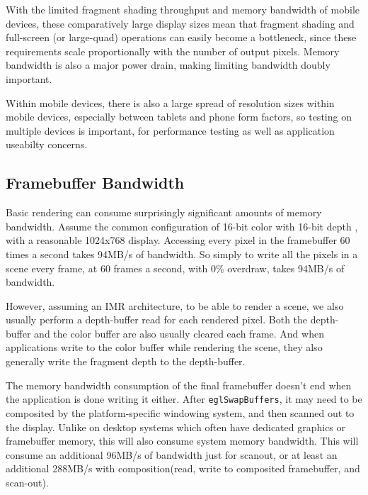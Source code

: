 
With the limited fragment shading throughput and memory bandwidth of mobile
devices, these comparatively large display sizes mean that fragment shading and
full-screen (or large-quad) operations can easily become a bottleneck, since these requirements scale proportionally with the number of output pixels.  Memory
bandwidth is also a major power drain, making limiting bandwidth doubly
important.

Within mobile devices, there is also a large spread of resolution sizes within
mobile devices, especially between tablets and phone form factors, so testing
on multiple devices is important, for performance testing as well as
application useabilty concerns.

\subsection{Framebuffer Bandwidth}\label{Jon-McCaffrey-Framebuffer-Bandwidth}

Basic rendering can consume surprisingly significant amounts of memory
bandwidth.  Assume the common configuration of 16-bit color with 16-bit depth
\cite{Google11}, with a reasonable 1024x768 display.  Accessing every pixel in
the framebuffer 60 times a second takes 94MB/s of bandwidth.  So simply to
write all the pixels in a scene every frame, at 60 frames a second, with 0\%
overdraw, takes 94MB/s of bandwidth.

 

However, assuming an IMR architecture, to be able to render a scene, we also
usually perform a depth-buffer read for each rendered pixel.  Both the
depth-buffer and the color buffer are also usually cleared each frame.  And
when applications write to the color buffer while rendering the scene, they
also generally write the fragment depth to the depth-buffer.

The memory bandwidth consumption of the final framebuffer doesn't end when the
application is done writing it either.  After \texttt{eglSwapBuffers}, it may
need to be composited by the platform-specific windowing system, and then
scanned out to the display.  Unlike on desktop systems which often have
dedicated graphics or framebuffer memory, this will also consume system memory
bandwidth.  This will consume an additional 96MB/s of bandwidth just for
scanout, or at least an additional 288MB/s with composition(read, write to
composited framebuffer, and scan-out).

